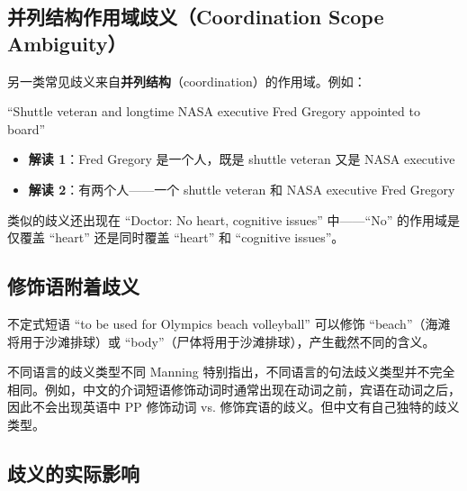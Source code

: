 \documentclass[a4paper]{article}
\begin{document}



\subsection{并列结构作用域歧义（Coordination Scope Ambiguity）}





另一类常见歧义来自\textbf{并列结构}（coordination）的作用域。例如：

``Shuttle veteran and longtime NASA executive Fred Gregory appointed to board''

\begin{itemize}
    \item \textbf{解读 1}：Fred Gregory 是一个人，既是 shuttle veteran 又是 NASA executive
    \item \textbf{解读 2}：有两个人——一个 shuttle veteran 和 NASA executive Fred Gregory
\end{itemize}

类似的歧义还出现在 ``Doctor: No heart, cognitive issues'' 中——``No'' 的作用域是仅覆盖 ``heart'' 还是同时覆盖 ``heart'' 和 ``cognitive issues''。





\subsection{修饰语附着歧义}





不定式短语 ``to be used for Olympics beach volleyball'' 可以修饰 ``beach''（海滩将用于沙滩排球）或 ``body''（尸体将用于沙滩排球），产生截然不同的含义。

\begin{knowledgebox}{不同语言的歧义类型不同}
Manning 特别指出，不同语言的句法歧义类型并不完全相同。例如，中文的介词短语修饰动词时通常出现在动词之前，宾语在动词之后，因此不会出现英语中 PP 修饰动词 vs. 修饰宾语的歧义。但中文有自己独特的歧义类型。
\end{knowledgebox}

\subsection{歧义的实际影响}
\end{document}
